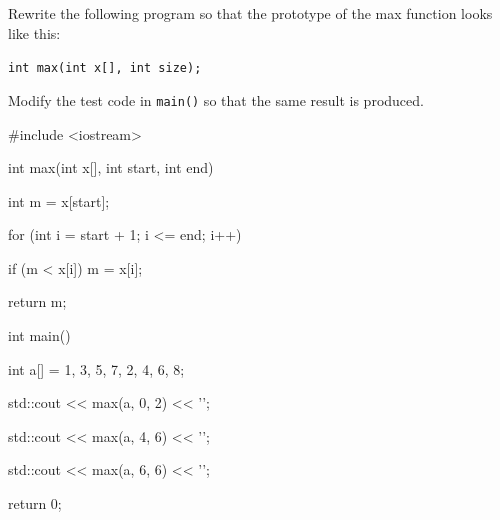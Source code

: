 Rewrite the following program so that the prototype of the max function looks like this:



\verb!int max(int x[], int size);!



Modify the test code in \texttt{main()} so that the same result is produced.



\begin{consolethree}[escapeinside=||]

#include <iostream>

int max(int x[], int start, int end)

{

    int m = x[start];

    for (int i = start + 1; i <= end; i++)

    {

        if (m < x[i]) m = x[i];

    }

    return m;

}

int main()

{

    int a[] = {1, 3, 5, 7, 2, 4, 6, 8};

    std::cout << max(a, 0, 2) << '\n';

    std::cout << max(a, 4, 6) << '\n';

    std::cout << max(a, 6, 6) << '\n';

    return 0;

}

\end{consolethree}

